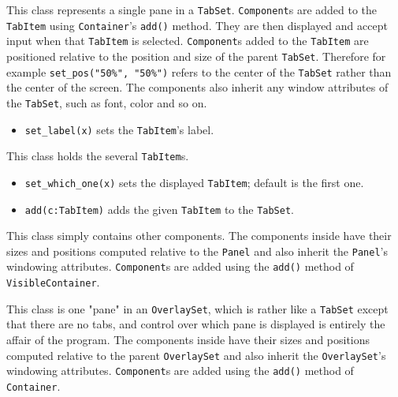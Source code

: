 \medskip{}

This class represents a single pane in a \texttt{TabSet}.  \texttt{Component}s are added to
the  \texttt{TabItem} using  \texttt{Container}'s \texttt{add()} method. They are
then displayed and accept input when that  \texttt{TabItem} is selected.
 \texttt{Component}s added to the  \texttt{TabItem} are positioned relative to the position
and size of the parent  \texttt{TabSet}. Therefore for example
\texttt{set\_pos("50\%", "50\%")} refers to the center of the \texttt{TabSet}
rather than the center of the screen. The components also inherit any
window attributes of the \texttt{TabSet}, such as font, color and so on.

\begin{itemize}
\item\noindent\texttt{set\_label(x)} sets the  \texttt{TabItem}'s label.
\end{itemize}

\medskip{}

This class holds the several  \texttt{TabItem}s.
\begin{itemize}
\item\noindent\texttt{set\_which\_one(x)} sets the displayed  \texttt{TabItem};
default is the first one.

\item\noindent\texttt{add(c:TabItem)} adds the given  \texttt{TabItem} to the  \texttt{TabSet}.
\end{itemize}

\medskip{}

This class simply contains other components. The components inside have
their sizes and positions computed relative to the  \texttt{Panel} and also
inherit the  \texttt{Panel}'s windowing attributes.  \texttt{Component}s
are added using the \texttt{add()} method of  \texttt{VisibleContainer}.

\medskip{}

This class is one "pane" in an  \texttt{OverlaySet},
which is rather like a \texttt{TabSet} except that there are no tabs, and
control over which pane is displayed is entirely the affair of the
program. The components inside have their sizes and positions computed
relative to the parent  \texttt{OverlaySet} and also inherit the
 \texttt{OverlaySet}'s windowing attributes.  \texttt{Component}s are
added using the \texttt{add()} method of  \texttt{Container}.

